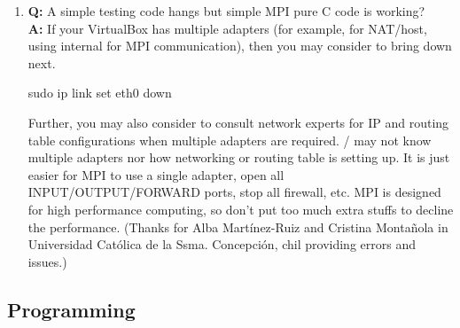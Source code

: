 \begin{enumerate}
\item {\bf\color{blue} Q:}
      A simple  testing code hangs but simple MPI pure C code is
      working? \\
      {\bf\color{blue} A:}
      If your VirtualBox has multiple adapters (for example,  for
      NAT/host,  using internal  for MPI
      communication), then you may consider to bring down  next.
\begin{Command}
sudo ip link set eth0 down
\end{Command}
      Further, you may also consider
      to consult network experts for IP and routing table configurations
      when multiple adapters are required.
      / may not know multiple adapters nor
      how networking or routing table is setting up. It is just easier for
      MPI to use a single adapter, open all INPUT/OUTPUT/FORWARD ports,
      stop all firewall, etc. MPI is designed for high performance computing,
      so don't put too much extra stuffs to decline the performance.
      (Thanks for Alba Mart\'{i}nez-Ruiz and Cristina Monta\~{n}ola in
       Universidad Cat\'{o}lica de la Ssma. Concepci\'{o}n, chil
       providing errors and issues.)

\end{enumerate}


\subsection[Programming]{Programming}
\label{sec:programming}


